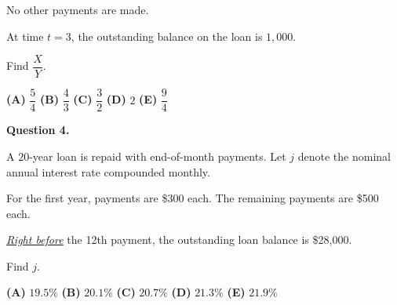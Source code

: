 \documentclass[11pt]{article}
\begin{document}
No other payments are made.

At time \(t=3\), the outstanding balance on the loan is \(1{,}000\).

Find \(\dfrac{X}{Y}\).

\medskip

\begin{center}

\textbf{(A)} \(\dfrac{5}{4}\)
\hspace{1cm}
\textbf{(B)} \(\dfrac{4}{3}\)
\hspace{1cm}
\textbf{(C)} \(\dfrac{3}{2}\)
\hspace{1cm}
\textbf{(D)} \(2\)
\hspace{1cm}
\textbf{(E)} \(\dfrac{9}{4}\)

\end{center}

\newpage


\noindent\textbf{Question 4.}  

A $20$-year loan is repaid with end-of-month payments. Let \(j\) denote the nominal annual interest rate compounded monthly.

For the first year, payments are \$300 each. The remaining payments are \$500 each.

\textit{\underline{Right before}} the 12th payment, the outstanding loan balance is \$28{,}000.

Find \(j\).

\medskip

\begin{center}

\textbf{(A)} \(19.5\%\)
\hspace{1cm}
\textbf{(B)} \(20.1\%\)
\hspace{1cm}
\textbf{(C)} \(20.7\%\)
\hspace{1cm}
\textbf{(D)} \(21.3\%\)
\hspace{1cm}
\textbf{(E)} \(21.9\%\)

\end{center}
\end{document}
